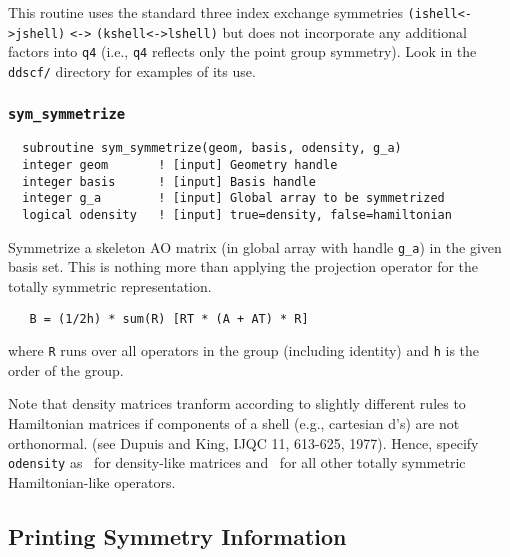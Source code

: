 This routine uses the standard three index exchange symmetries
\verb+(ishell<->jshell)+ \verb+<->+ \verb+(kshell<->lshell)+ but does
not incorporate any additional factors into \verb+q4+ (i.e., \verb+q4+
reflects only the point group symmetry).  Look in the \verb+ddscf/+
directory for examples of its use.

\subsubsection{{\tt sym\_symmetrize}}
\begin{verbatim}
  subroutine sym_symmetrize(geom, basis, odensity, g_a)
  integer geom       ! [input] Geometry handle
  integer basis      ! [input] Basis handle
  integer g_a        ! [input] Global array to be symmetrized
  logical odensity   ! [input] true=density, false=hamiltonian
\end{verbatim}
Symmetrize a skeleton AO matrix (in global array with handle
\verb+g_a+) in the given basis set.  This is nothing more than
applying the projection operator for the totally symmetric
representation.
\begin{verbatim}
   B = (1/2h) * sum(R) [RT * (A + AT) * R]
\end{verbatim}
where \verb+R+ runs over all operators in the group (including
identity) and \verb+h+ is the order of the group.

Note that density matrices tranform according to slightly different
rules to Hamiltonian matrices if components of a shell (e.g.,
cartesian d's) are not orthonormal.  (see Dupuis and King, IJQC 11,
613-625, 1977).  Hence, specify \verb+odensity+ as \TRUE\ for
density-like matrices and \FALSE\ for all other totally symmetric
Hamiltonian-like operators.

\subsection{Printing Symmetry Information}

